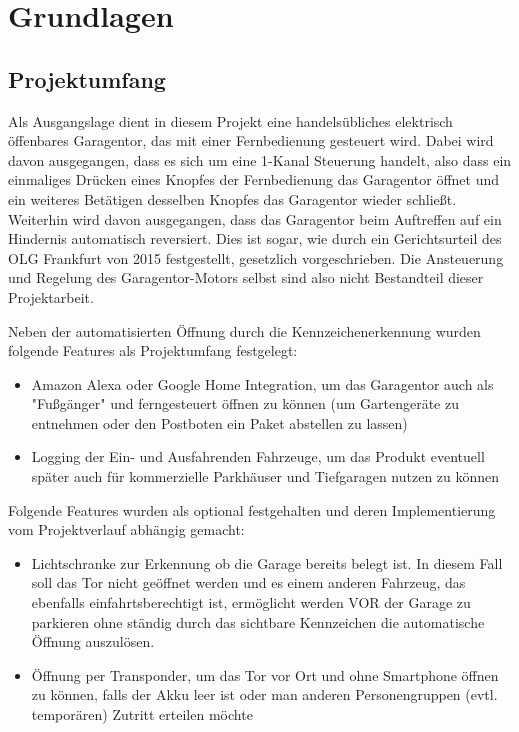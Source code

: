 \chapter{Grundlagen}
\section{Projektumfang}
Als Ausgangslage dient in diesem Projekt eine handelsübliches elektrisch öffenbares Garagentor, das mit einer Fernbedienung gesteuert wird. Dabei wird davon ausgegangen, dass es sich um eine 1-Kanal Steuerung handelt, also dass ein einmaliges Drücken eines Knopfes der Fernbedienung das Garagentor öffnet und ein weiteres Betätigen desselben Knopfes das Garagentor wieder schließt. Weiterhin wird davon ausgegangen, dass das Garagentor beim Auftreffen auf ein Hindernis automatisch reversiert. Dies ist sogar, wie durch ein Gerichtsurteil des OLG Frankfurt von 2015 festgestellt, gesetzlich vorgeschrieben. %
Die Ansteuerung und Regelung des Garagentor-Motors selbst sind also nicht Bestandteil dieser Projektarbeit.

Neben der automatisierten Öffnung durch die Kennzeichenerkennung wurden folgende Features als Projektumfang festgelegt:

\begin{itemize}
\item Amazon Alexa oder Google Home Integration, um das Garagentor auch als "Fußgänger" und ferngesteuert öffnen zu können (um Gartengeräte zu entnehmen oder den Postboten ein Paket abstellen zu lassen)




\item Logging der Ein- und Ausfahrenden Fahrzeuge, um das Produkt eventuell später auch für kommerzielle Parkhäuser und Tiefgaragen nutzen zu können
\end{itemize}
Folgende Features wurden als optional festgehalten und deren Implementierung vom Projektverlauf abhängig gemacht:
\begin{itemize}
\item Lichtschranke zur Erkennung ob die Garage bereits belegt ist. In diesem Fall soll das Tor nicht geöffnet werden und es einem anderen Fahrzeug, das ebenfalls einfahrtsberechtigt ist, ermöglicht werden VOR der Garage zu parkieren ohne ständig durch das sichtbare Kennzeichen die automatische Öffnung auszulösen.

\item Öffnung per Transponder, um das Tor vor Ort und ohne Smartphone öffnen zu können, falls der Akku leer ist oder man anderen Personengruppen (evtl. temporären) Zutritt erteilen möchte
\end{itemize}

